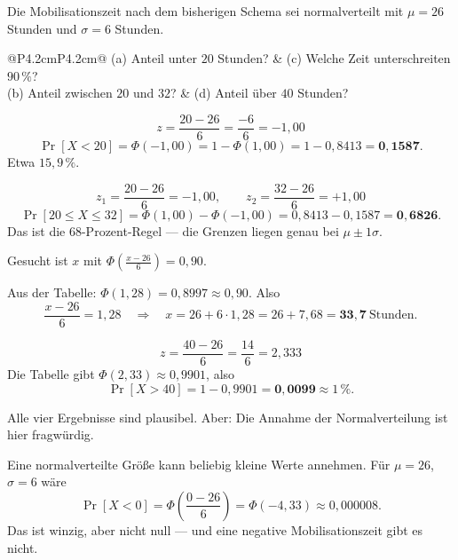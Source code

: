 \begin{aufgabe}
Die Mobilisationszeit nach dem bisherigen Schema sei normalverteilt mit $\mu = 26$ Stunden und $\sigma = 6$ Stunden.
\begin{center}
{\small
\renewcommand{\arraystretch}{1.35}
\begin{tabular}{@{}P{4.2cm}P{4.2cm}@{}}
\toprule
(a) Anteil unter $20$ Stunden? & (c) Welche Zeit unterschreiten $90\,\%$?\\
(b) Anteil zwischen $20$ und $32$? & (d) Anteil über $40$ Stunden?\\
\bottomrule
\end{tabular}}
\end{center}

\loesung
{}
\[ z = \frac{20 - 26}{6} = \frac{-6}{6} = -1{,}00 \]
\[ \Pr[X < 20] = \Phi(-1{,}00) = 1 - \Phi(1{,}00) = 1 - 0{,}8413 = \mathbf{0{,}1587} . \]
Etwa $15{,}9\,\%$.

\[ z_1 = \frac{20-26}{6} = -1{,}00, \qquad z_2 = \frac{32-26}{6} = +1{,}00 \]
\[ \Pr[20 \le X \le 32] = \Phi(1{,}00) - \Phi(-1{,}00) = 0{,}8413 - 0{,}1587 = \mathbf{0{,}6826} . \]
Das ist die $68$-Prozent-Regel --- die Grenzen liegen genau bei $\mu \pm 1\sigma$. \checkmark

Gesucht ist $x$ mit $\Phi\!\left(\frac{x-26}{6}\right) = 0{,}90$.

Aus der Tabelle: $\Phi(1{,}28) = 0{,}8997 \approx 0{,}90$. Also
\[ \frac{x - 26}{6} = 1{,}28 \quad\Longrightarrow\quad x = 26 + 6 \cdot 1{,}28 = 26 + 7{,}68 = \mathbf{33{,}7} \ \text{Stunden} . \]

\[ z = \frac{40-26}{6} = \frac{14}{6} = 2{,}333 \]
Die Tabelle gibt $\Phi(2{,}33) \approx 0{,}9901$, also
\[ \Pr[X > 40] = 1 - 0{,}9901 = \mathbf{0{,}0099} \approx 1\,\% . \]

Alle vier Ergebnisse sind plausibel. Aber: Die Annahme der Normalverteilung ist hier fragwürdig.

Eine normalverteilte Größe kann beliebig kleine Werte annehmen. Für $\mu=26$, $\sigma=6$ wäre
\[ \Pr[X < 0] = \Phi\!\left(\frac{0-26}{6}\right) = \Phi(-4{,}33) \approx 0{,}000008 . \]
Das ist winzig, aber nicht null --- und eine negative Mobilisationszeit gibt es nicht.

\begin{center}
\begin{minipage}{0.86\textwidth}
\end{minipage}
\end{center}
\end{aufgabe}

